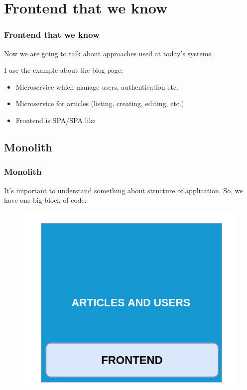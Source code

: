 
\section{Frontend that we know}
\begin{frame}
  \frametitle{Frontend that we know}
Now we are going to talk about approaches used at today's systems. \newline

I use the example about the blog page:
\begin{itemize}
	\item Microservice which manage users, authentication etc.
	\item Microservice for articles (listing, creating, editing, etc.)
	\item Frontend is SPA/SPA like
\end{itemize}
\end{frame}


\subsection{Monolith}

\begin{frame}
	\frametitle{Monolith}
	It's important to understand something about structure of application.
	So, we have one big block of code:
	\begin{figure}
		\centering
		\includegraphics[width=0.6\linewidth]{pictures/monolit.png}		
		\label{fig:monolit}
	\end{figure}
\end{frame}

